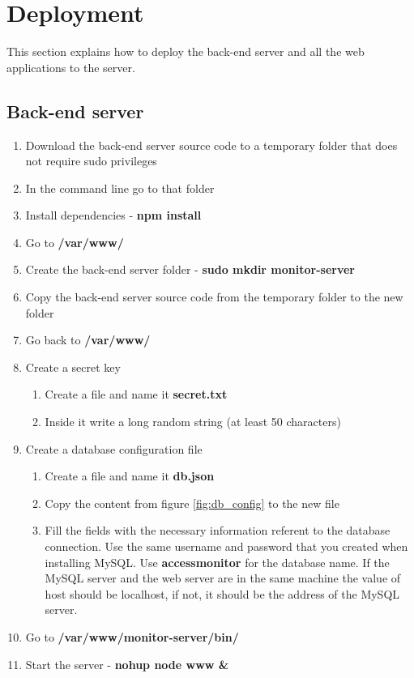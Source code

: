 \section{Deployment}

This section explains how to deploy the back-end server and all the web applications to the server.

\subsection{Back-end server}

\begin{enumerate}
    \item Download the back-end server source code to a temporary folder that does not require sudo privileges
    \item In the command line go to that folder
    \item Install dependencies - \textbf{npm install}
    \item Go to \textbf{/var/www/}
    \item Create the back-end server folder - \textbf{sudo mkdir monitor-server}
    \item Copy the back-end server source code from the temporary folder to the new folder
    \item Go back to \textbf{/var/www/}
    \item Create a secret key
    \begin{enumerate}
        \item Create a file and name it \textbf{secret.txt}
        \item Inside it write a long random string (at least 50 characters)
    \end{enumerate}
    \item Create a database configuration file
    \begin{enumerate}
        \item Create a file and name it \textbf{db.json}
        \item Copy the content from figure \ref{fig:db_config} to the new file
        \item Fill the fields with the necessary information referent to the database connection. Use the same username and password that you created when installing MySQL. Use \textbf{accessmonitor} for the database name. If the MySQL server and the web server are in the same machine the value of host should be localhost, if not, it should be the address of the MySQL server.
    \end{enumerate}
    \item Go to \textbf{/var/www/monitor-server/bin/}
    \item Start the server - \textbf{nohup node www \&}
\end{enumerate}

